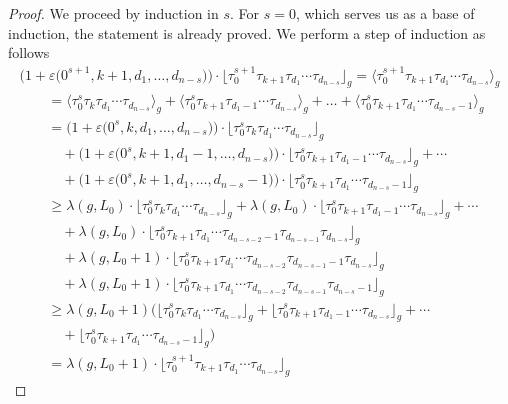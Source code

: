 \documentclass[11pt]{article}
\renewcommand{\epsilon}{\varepsilon}
\theoremstyle{definition}
\begin{document}
\begin{proof}
We proceed by induction in $s$. For $s=0$, which serves us as a base of induction, the statement is already proved. We
perform a step of induction as follows
\begin{gather*}
\big(1+\epsilon\big(0^{s+1},k+1,d_1,\dots,d_{n-s}\big)\big)
\cdot\big\lfloor\tau_0^{s+1}\tau_{k+1}\tau_{d_1}\cdots\tau_{d_{n-s}}\big\rfloor_g
 =\big\langle\tau_0^{s+1}\tau_{k+1}\tau_{d_1}\cdots\tau_{d_{n-s}}\big\rangle_g
\\
\qquad{} =\big\langle\tau_0^s\tau_k\tau_{d_1}\cdots\tau_{d_{n-s}}\big\rangle_g
+\big\langle\tau_0^s\tau_{k+1}\tau_{d_1-1}\cdots\tau_{d_{n-s}}\big\rangle_g
+\dots
+\big\langle\tau_0^s\tau_{k+1}\tau_{d_1}\cdots\tau_{d_{n-s}-1}\big\rangle_g
\\
\qquad{} =\big(1+\epsilon\big(0^s,k,d_1,\dots,d_{n-s}\big)\big)
\cdot\big\lfloor\tau_0^s\tau_k\tau_{d_1}\cdots\tau_{d_{n-s}}\big\rfloor_g
\\
\qquad\quad{}+\big(1+\epsilon\big(0^s,k+1,d_1-1,\dots,d_{n-s}\big)\big)
\cdot\big\lfloor\tau_0^s\tau_{k+1}\tau_{d_1-1}\cdots\tau_{d_{n-s}}\big\rfloor_g
+\cdots
\\
\qquad\quad{} +\big(1+\epsilon\big(0^s,k+1,d_1,\dots,d_{n-s}-1\big)\big)
\cdot\big\lfloor\tau_0^s\tau_{k+1}\tau_{d_1}\cdots\tau_{d_{n-s}-1}\big\rfloor_g
\\
\qquad{} \ge\lambda(g,L_0)
\cdot\big\lfloor\tau_0^s\tau_k\tau_{d_1}\cdots\tau_{d_{n-s}}\big\rfloor_g
+\lambda(g,L_0)
\cdot\big\lfloor\tau_0^s\tau_{k+1}\tau_{d_1-1}\cdots\tau_{d_{n-s}}\big\rfloor_g+\cdots
\\
\qquad\quad{} +\lambda(g,L_0)
\cdot\big\lfloor\tau_0^s\tau_{k+1}\tau_{d_1}\cdots\tau_{d_{n-s-2}-1}\tau_{d_{n-s-1}}\tau_{d_{n-s}}\big\rfloor_g\\
\qquad\quad{} +\lambda(g,L_0+1)
\cdot\big\lfloor\tau_0^s\tau_{k+1}\tau_{d_1}\cdots\tau_{d_{n-s-2}}\tau_{d_{n-s-1}-1}\tau_{d_{n-s}}\big\rfloor_g
\\
\qquad\quad{}
+\lambda(g,L_0+1)
\cdot\big\lfloor\tau_0^s\tau_{k+1}\tau_{d_1}\cdots\tau_{d_{n-s-2}}\tau_{d_{n-s-1}}\tau_{d_{n-s}-1}\big\rfloor_g
\\
\qquad{} \ge\lambda(g,L_0+1)\big(
\big\lfloor\tau_0^s\tau_k\tau_{d_1}\cdots\tau_{d_{n-s}}\big\rfloor_g
+\big\lfloor\tau_0^s\tau_{k+1}\tau_{d_1-1}\cdots\tau_{d_{n-s}}\big\rfloor_g
+\cdots\\
\qquad\quad{}
+\big\lfloor\tau_0^s\tau_{k+1}\tau_{d_1}\cdots\tau_{d_{n-s}-1}\big\rfloor_g
\big)\\
\qquad{} =
\lambda(g,L_0+1)
\cdot\big\lfloor\tau_0^{s+1}\tau_{k+1}\tau_{d_1}\cdots\tau_{d_{n-s}}\big\rfloor_g

\end{gather*}
\end{proof}
\end{document}
